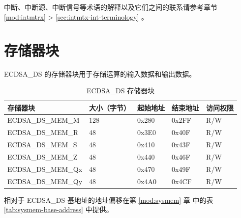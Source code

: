 \documentclass[main\_\_CN.tex]{subfiles}
\begin{document}
\begin{tiplisting}
中断、中断源、中断信号等术语的解释以及它们之间的联系请参考章节 \ref{mod:intmtrx} \textit{} > \ref{sec:intmtx-int-terminology} \textit{}。
\end{tiplisting}

\newpage
\section{存储器块}

ECDSA\_DS 的存储器块用于存储运算的输入数据和输出数据。

\begin{table}[H]
    \centering
    \caption{ECDSA\_DS 存储器块} \label{tab:ecdsa-memory}
    \begin{threeparttable}
    \begin{tabular}{ | l | l | l | l | l | }
    \hline
        \rowcolor{lightgray}
        \textbf{存储器块} & \textbf{大小（字节）}  &  \textbf{起始地址}\tnote{*} &  \textbf{结束地址} \tnote{*} & \textbf{访问权限}   \\ \hline
        ECDSA\_DS\_MEM\_M    & 128  & 0x280 & 0x2FF & R/W \\ \hline
        ECDSA\_DS\_MEM\_R    & 48   & 0x3E0 & 0x40F & R/W \\ \hline
        ECDSA\_DS\_MEM\_S    & 48   & 0x410 & 0x43F & R/W \\ \hline
        ECDSA\_DS\_MEM\_Z    & 48   & 0x440 & 0x46F & R/W \\ \hline
        ECDSA\_DS\_MEM\_Qx   & 48   & 0x470 & 0x49F & R/W \\ \hline
        ECDSA\_DS\_MEM\_Qy   & 48   & 0x4A0 & 0x4CF & R/W \\ \hline
    \end{tabular}
    \begin{tablenotes}
        \item[*] 相对于 ECDSA\_DS 基地址的地址偏移在第 \ref{mod:sysmem} 章\textit{} 中的表 \ref{tab:sysmem-base-address} 中提供。
    \end{tablenotes}
    \end{threeparttable}
\end{table}



\end{document}
